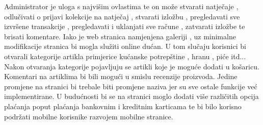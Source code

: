 {			\vspace{3mm}
			\newline Administrator je uloga s najvišim ovlastima te on može stvarati natječaje , odlučivati o prijavi kolekcije na natječaj , stvarati izložbu , pregledavati sve izvršene transakcije ,  pregledavati i uklanjati sve račune , zatvarati izložbe te brisati komentare.
			\vspace{3mm}
			\newline Iako je web stranica namjenjena galeriji , uz minimalne modifikacije stranica bi mogla služiti online dućan. U tom slučaju korisnici bi otvarali kategorije artikla primjerice kućanske  potrepštine , hranu , piće itd... Nakon otvaranja kategorije  pojavljuju se artikli koje je moguće dodati u košaricu. Komentari na artiklima bi bili mogući u smislu recenzije proizvoda.	
			Jedine promjene na stranici bi trebale biti promjene naziva jer su sve ostale funkcije već implementirane. 
			\vspace{3mm}
			\newline U budućnosti bi se na stranici moglo dodati više različitih opcija plaćanja poput plaćanja bankovnim i kreditnim karticama te bi bilo korisno podržati mobilne korisnike razvojem  mobilne stranice.
}
		
